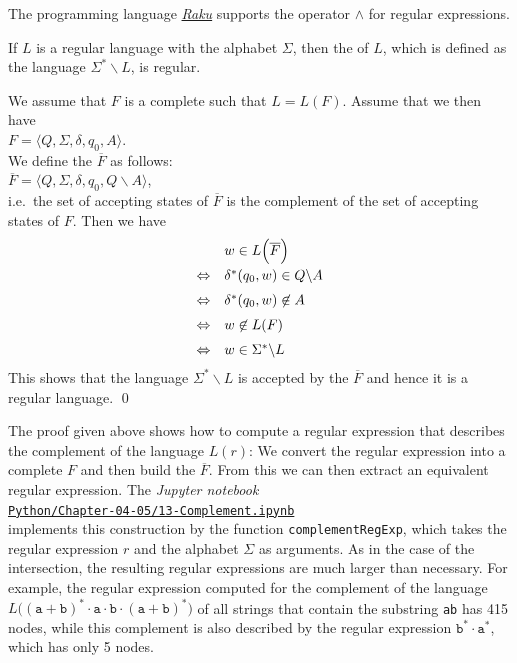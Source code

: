 \remarkEng
The programming language \href{https://raku.org}{\textsl{Raku}}  supports the operator $\wedge$ for regular expressions.

\begin{Proposition}
  If $L$ is a regular language with the alphabet $\Sigma$, then the  
  of $L$, which is defined as the language $\Sigma^* \backslash L$, is regular.
\end{Proposition}

\proofEng
We assume that $F$ is a complete   such that $L = L(F)$.
Assume that we then have
\\[0.2cm]
\hspace*{1.3cm} $F = \langle Q, \Sigma, \delta, q_0, A \rangle$.
\\[0.2cm]
We define the   $\overline{F}$ as follows:
\\[0.2cm]
\hspace*{1.3cm} $\overline{F} = \langle Q, \Sigma, \delta, q_0, Q \backslash A \rangle$,
\\[0.2cm]
i.e.~the set of accepting states of $\overline{F}$ is the complement of the set of accepting
states of $F$.  Then we have
$$
\begin{array}[t]{cl}
                  & w \in L\Bigl(\overline{F}\Bigr)                      \\[0.2cm]
  \Leftrightarrow & \delta^*(q_0, w) \in Q \backslash A     \\[0.2cm]
  \Leftrightarrow & \delta^*(q_0, w) \not\in A \\[0.2cm]
  \Leftrightarrow & w \not\in L(F) \\[0.2cm]
   \Leftrightarrow & w \in \Sigma^* \backslash L 
 \end{array}
$$
This shows that the language $\Sigma^* \backslash L$ is accepted by the  $\overline{F}$
and hence it is a regular language.
 \qed

\remarkEng
The proof given above shows how to compute a regular expression that describes the complement of the language
$L(r)$:  We convert the regular expression into a complete  $F$ and then build the
  $\overline{F}$.  From this  we can then extract an equivalent regular expression.  The
\textsl{Jupyter notebook}
\\[0.2cm]
\hspace*{1.3cm}
\href{https://github.com/karlstroetmann/Formal-Languages/blob/master/Python/Chapter-04-05/13-Complement.ipynb}{\texttt{Python/Chapter-04-05/13-Complement.ipynb}}
\\[0.2cm]
implements this construction by the function \texttt{complementRegExp}, which takes the regular expression $r$
and the alphabet $\Sigma$ as arguments.  As in the case of the intersection, the resulting regular expressions
are much larger than necessary.  For example, the regular expression computed for the complement of the
language $L\bigl((\texttt{a} + \texttt{b})^* \cdot \texttt{a} \cdot \texttt{b} \cdot (\texttt{a} + \texttt{b})^*\bigr)$
of all strings that contain the substring \texttt{ab} has 415 nodes, while this complement is also described
by the regular expression $\texttt{b}^* \cdot \texttt{a}^*$, which has only 5 nodes.
\eox

